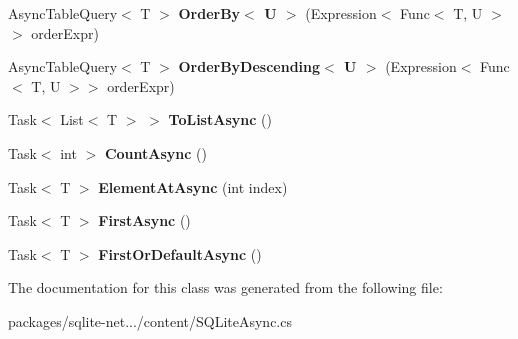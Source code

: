 \begin{DoxyCompactItemize}
\item 
\hypertarget{classSQLite_1_1AsyncTableQuery_3_01T_01_4_a41540b08c3c49c123b57de8a0a5e3aea}{Async\-Table\-Query$<$ T $>$ {\bfseries Order\-By$<$ U $>$} (Expression$<$ Func$<$ T, U $>$$>$ order\-Expr)}\label{classSQLite_1_1AsyncTableQuery_3_01T_01_4_a41540b08c3c49c123b57de8a0a5e3aea}

\item 
\hypertarget{classSQLite_1_1AsyncTableQuery_3_01T_01_4_a4a45b5c81ccf4459f17d66fba6a18c3f}{Async\-Table\-Query$<$ T $>$ {\bfseries Order\-By\-Descending$<$ U $>$} (Expression$<$ Func$<$ T, U $>$$>$ order\-Expr)}\label{classSQLite_1_1AsyncTableQuery_3_01T_01_4_a4a45b5c81ccf4459f17d66fba6a18c3f}

\item 
\hypertarget{classSQLite_1_1AsyncTableQuery_3_01T_01_4_a7343ff525af21bdc055935f46a39ae72}{Task$<$ List$<$ T $>$ $>$ {\bfseries To\-List\-Async} ()}\label{classSQLite_1_1AsyncTableQuery_3_01T_01_4_a7343ff525af21bdc055935f46a39ae72}

\item 
\hypertarget{classSQLite_1_1AsyncTableQuery_3_01T_01_4_a70df4365834cfe29d0adb1c1841266b0}{Task$<$ int $>$ {\bfseries Count\-Async} ()}\label{classSQLite_1_1AsyncTableQuery_3_01T_01_4_a70df4365834cfe29d0adb1c1841266b0}

\item 
\hypertarget{classSQLite_1_1AsyncTableQuery_3_01T_01_4_ade7303c76081c4b9cd80b4d25806ca30}{Task$<$ T $>$ {\bfseries Element\-At\-Async} (int index)}\label{classSQLite_1_1AsyncTableQuery_3_01T_01_4_ade7303c76081c4b9cd80b4d25806ca30}

\item 
\hypertarget{classSQLite_1_1AsyncTableQuery_3_01T_01_4_a2e3bae8cc7dc0b16abd95d4516d61971}{Task$<$ T $>$ {\bfseries First\-Async} ()}\label{classSQLite_1_1AsyncTableQuery_3_01T_01_4_a2e3bae8cc7dc0b16abd95d4516d61971}

\item 
\hypertarget{classSQLite_1_1AsyncTableQuery_3_01T_01_4_aac82a5fa254a7f1c6a1a08f534989604}{Task$<$ T $>$ {\bfseries First\-Or\-Default\-Async} ()}\label{classSQLite_1_1AsyncTableQuery_3_01T_01_4_aac82a5fa254a7f1c6a1a08f534989604}

\end{DoxyCompactItemize}


The documentation for this class was generated from the following file\-:\begin{DoxyCompactItemize}
\item 
packages/sqlite-\/net.../content/S\-Q\-Lite\-Async.\-cs\end{DoxyCompactItemize}

